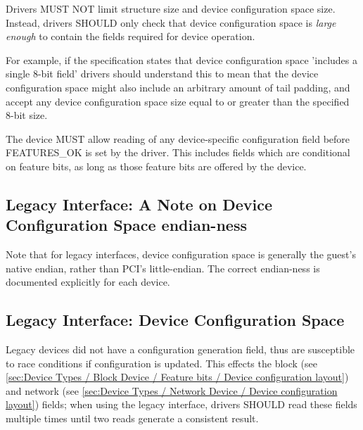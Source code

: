 Drivers MUST
NOT limit structure size and device configuration space size.  Instead,
drivers SHOULD only check that device configuration space is {\em large enough} to
contain the fields required for device operation.

\begin{note}
For example, if the specification states that device configuration
space 'includes a single 8-bit field' drivers should understand this to mean that
the device configuration space might also include an arbitrary amount of
tail padding, and accept any device configuration space size equal to or
greater than the specified 8-bit size.
\end{note}

The device MUST allow reading of any device-specific configuration
field before FEATURES_OK is set by the driver.  This includes fields which are
conditional on feature bits, as long as those feature bits are offered
by the device.

\subsection{Legacy Interface: A Note on Device Configuration Space endian-ness}\label{sec:Basic Facilities of a Virtio Device / Device Configuration Space / Legacy Interface: A Note on Configuration Space endian-ness}

Note that for legacy interfaces, device configuration space is generally the
guest's native endian, rather than PCI's little-endian.
The correct endian-ness is documented explicitly for each device.

\subsection{Legacy Interface: Device Configuration Space}\label{sec:Basic Facilities of a Virtio Device / Device Configuration Space / Legacy Interface: Device Configuration Space}

Legacy devices did not have a configuration generation field, thus are
susceptible to race conditions if configuration is updated.  This
effects the block  (see \ref{sec:Device Types /
Block Device / Feature bits / Device configuration layout}) and
network  (see \ref{sec:Device Types / Network Device /
Device configuration layout}) fields;
when using the legacy interface, drivers SHOULD
read these fields multiple times until two reads generate a consistent
result.

